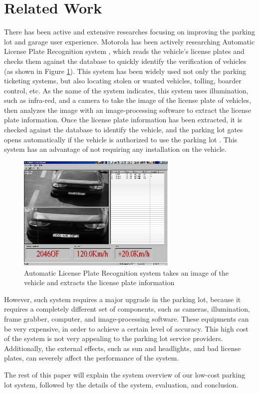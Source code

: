 \section{Related Work}

There has been active and extensive researches focusing on improving the parking lot and garage user experience. Motorola has been actively researching Automatic License Plate Recognition system \cite{alpr}, which reads the vehicle's license plates and checks them against the database to quickly identify the verification of vehicles (as shown in Figure \ref{fig:alpr}). This system has been widely used not only the parking ticketing systems, but also locating stolen or wanted vehicles, tolling, boarder control, etc. As the name of the system indicates, this system uses illumination, such as infra-red, and a camera to take the image of the license plate of vehicles, then analyzes the image with an image-processing software to extract the license plate information. Once the license plate information has been extracted, it is checked against the database to identify the vehicle, and the parking lot gates opens automatically if the vehicle is authorized to use the parking lot \cite{lpr}. This system has an advantage of not requiring any installation on the vehicle.

\begin{figure}[ht]
	\centering
		\includegraphics[width=3in]{figure/alpr.jpg}
		\caption{Automatic License Plate Recognition system takes an image of the vehicle and extracts the license plate information}
	\label{fig:alpr}
\end{figure}

However, such system requires a major upgrade in the parking lot, because it requires a completely different set of components, such as cameras, illumination, frame grabber, computer, and image-processing software. 	These equipments can be very expensive, in order to achieve a certain level of accuracy. This high cost of the system is not very appealing to the parking lot service providers. Additionally, the external effects, such as sun and headlights, and bad license plates, can severely affect the performance of the system. 

The rest of this paper will explain the system overview of our low-cost parking lot system, followed by the details of the system, evaluation, and conclusion.